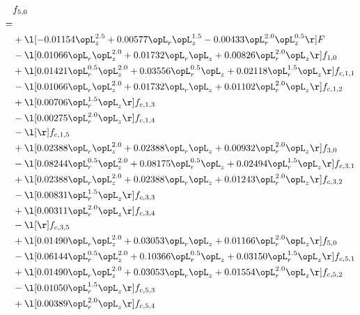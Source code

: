 \begin{alignat}{2} 
\label{eq:f_50_1} 
& f_{5,0} \nonumber \\ 
 = \\ 
& + \l[  -0.01154 \opL_z^{2.5} +  0.00577 \opL_r \opL_z^{1.5}   -0.00433 \opL_r^{2.0} \opL_z^{0.5}  \r] F \nonumber \\ 
& - \l[  0.01066 \opL_r \opL_z^{2.0} +  0.01732 \opL_r \opL_z +  0.00826 \opL_r^{2.0} \opL_z  \r] f_{1,0} \nonumber \\ 
& + \l[  0.01421 \opL_r^{0.5} \opL_z^{2.0} +  0.03556 \opL_r^{0.5} \opL_z +  0.02118 \opL_r^{1.5} \opL_z  \r] f_{c,1,1} \nonumber \\ 
& - \l[  0.01066 \opL_r \opL_z^{2.0} +  0.01732 \opL_r \opL_z +  0.01102 \opL_r^{2.0} \opL_z  \r] f_{c,1,2} \nonumber \\ 
& + \l[  0.00706 \opL_r^{1.5} \opL_z  \r] f_{c,1,3} \nonumber \\ 
& - \l[  0.00275 \opL_r^{2.0} \opL_z  \r] f_{c,1,4} \nonumber \\ 
& - \l[  \r] f_{c,1,5} \nonumber \\ 
& + \l[  0.02388 \opL_r \opL_z^{2.0} +  0.02388 \opL_r \opL_z +  0.00932 \opL_r^{2.0} \opL_z  \r] f_{3,0} \nonumber \\ 
& - \l[  0.08244 \opL_r^{0.5} \opL_z^{2.0} +  0.08175 \opL_r^{0.5} \opL_z +  0.02494 \opL_r^{1.5} \opL_z  \r] f_{c,3,1} \nonumber \\ 
& + \l[  0.02388 \opL_r \opL_z^{2.0} +  0.02388 \opL_r \opL_z +  0.01243 \opL_r^{2.0} \opL_z  \r] f_{c,3,2} \nonumber \\ 
& - \l[  0.00831 \opL_r^{1.5} \opL_z  \r] f_{c,3,3} \nonumber \\ 
& + \l[  0.00311 \opL_r^{2.0} \opL_z  \r] f_{c,3,4} \nonumber \\ 
& - \l[  \r] f_{c,3,5} \nonumber \\ 
& + \l[  0.01490 \opL_r \opL_z^{2.0} +  0.03053 \opL_r \opL_z +  0.01166 \opL_r^{2.0} \opL_z  \r] f_{5,0} \nonumber \\ 
& - \l[  0.06144 \opL_r^{0.5} \opL_z^{2.0} +  0.10366 \opL_r^{0.5} \opL_z +  0.03150 \opL_r^{1.5} \opL_z  \r] f_{c,5,1} \nonumber \\ 
& + \l[  0.01490 \opL_r \opL_z^{2.0} +  0.03053 \opL_r \opL_z +  0.01554 \opL_r^{2.0} \opL_z  \r] f_{c,5,2} \nonumber \\ 
& - \l[  0.01050 \opL_r^{1.5} \opL_z  \r] f_{c,5,3} \nonumber \\ 
& + \l[  0.00389 \opL_r^{2.0} \opL_z  \r] f_{c,5,4} \nonumber \\ 

\end{alignat}

